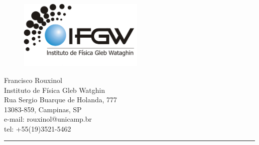 \documentclass[12pt]{article}
\date{} %
\makeatletter
\numberwithin{equation}{subsection}
\def\vhrulefill#1{\leavevmode\leaders\hrule\@height#1\hfill \kern\z@}
\makeatother
\begin{document}

\setcounter{page}{1} %
\thispagestyle{firstpage}

\begin{figure}
\includegraphics[width=6cm]{logo-documentos.png}
\end{figure}



\noindent 
\begin{flushright}
\begin{scriptsize}
Francisco Rouxinol \\
Instituto de Física Gleb Watghin\\
Rua Sergio Buarque de Holanda, 777\\
13083-859, Campinas, SP \\
e-mail: rouxinol@unicamp.br\\
tel: +55(19)3521-5462\\
\vhrulefill{1pt} \\ %
\end{scriptsize}
\end{flushright}


\end{document}
